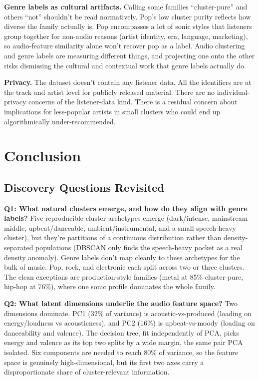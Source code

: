 \documentclass[10pt,twocolumn]{article}
\begin{document}
\textbf{Genre labels as cultural artifacts.} Calling some families ``cluster-pure'' and others ``not'' shouldn't be read normatively. Pop's low cluster purity reflects how diverse the family actually is. Pop encompasses a lot of sonic styles that listeners group together for non-audio reasons (artist identity, era, language, marketing), so audio-feature similarity alone won't recover pop as a label. Audio clustering and genre labels are measuring different things, and projecting one onto the other risks dismissing the cultural and contextual work that genre labels actually do.

\textbf{Privacy.} The dataset doesn't contain any listener data. All the identifiers are at the track and artist level for publicly released material. There are no individual-privacy concerns of the listener-data kind. There is a residual concern about implications for less-popular artists in small clusters who could end up algorithmically under-recommended.

\section{Conclusion}

\subsection{Discovery Questions Revisited}
\textbf{Q1: What natural clusters emerge, and how do they align with genre labels?} Five reproducible cluster archetypes emerge (dark/intense, mainstream middle, upbeat/danceable, ambient/instrumental, and a small speech-heavy cluster), but they're partitions of a continuous distribution rather than density-separated populations (DBSCAN only finds the speech-heavy pocket as a real density anomaly). Genre labels don't map cleanly to these archetypes for the bulk of music. Pop, rock, and electronic each split across two or three clusters. The clean exceptions are production-style families (metal at 85\% cluster-pure, hip-hop at 76\%), where one sonic profile dominates the whole family.

\textbf{Q2: What latent dimensions underlie the audio feature space?} Two dimensions dominate. PC1 (32\% of variance) is acoustic-vs-produced (loading on energy/loudness vs acousticness), and PC2 (16\%) is upbeat-vs-moody (loading on danceability and valence). The decision tree, fit independently of PCA, picks energy and valence as its top two splits by a wide margin, the same pair PCA isolated. Six components are needed to reach 80\% of variance, so the feature space is genuinely high-dimensional, but its first two axes carry a disproportionate share of cluster-relevant information.
\end{document}
